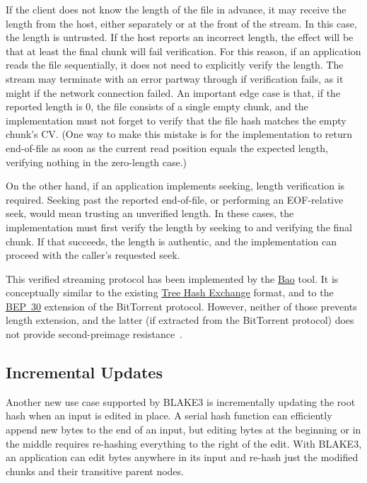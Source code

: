 \documentclass[11pt,notitlepage,a4paper]{article}
\begin{document}
If the client does not know the length of the file in advance, it may receive
the length from the host, either separately or at the front of the stream. In
this case, the length is untrusted. If the host reports an incorrect length,
the effect will be that at least the final chunk will fail verification. For
this reason, if an application reads the file sequentially, it does not need to
explicitly verify the length. The stream may terminate with an error partway
through if verification fails, as it might if the network connection failed. An
important edge case is that, if the reported length is 0, the file consists of
a single empty chunk, and the implementation must not forget to verify that the
file hash matches the empty chunk's CV. (One way to make this mistake is for
the implementation to return end-of-file as soon as the current read position
equals the expected length, verifying nothing in the zero-length case.)

On the other hand, if an application implements seeking, length verification is
required. Seeking past the reported end-of-file, or performing an EOF-relative
seek, would mean trusting an unverified length. In these cases, the
implementation must first verify the length by seeking to and verifying the
final chunk. If that succeeds, the length is authentic, and the implementation
can proceed with the caller's requested seek.

This verified streaming protocol has been implemented by the
\href{https://github.com/oconnor663/bao}{Bao} tool. It is conceptually similar
to the existing
\href{https://adc.sourceforge.io/draft-jchapweske-thex-02.html}{Tree Hash
Exchange} format, and to the
\href{https://www.bittorrent.org/beps/bep_0030.html}{BEP~30} extension of the
BitTorrent protocol. However, neither of those prevents length extension, and
the latter (if extracted from the BitTorrent protocol) does not provide
second-preimage resistance~\cite[\S8.5]{DBLP:journals/tosc/DaemenMA18}.

\subsection{Incremental Updates}\label{sec:incrementalupdate}

Another new use case supported by BLAKE3 is incrementally updating the root
hash when an input is edited in place. A serial hash function can efficiently
append new bytes to the end of an input, but editing bytes at the beginning or
in the middle requires re-hashing everything to the right of the edit. With
BLAKE3, an application can edit bytes anywhere in its input and re-hash just
the modified chunks and their transitive parent nodes.
\end{document}
